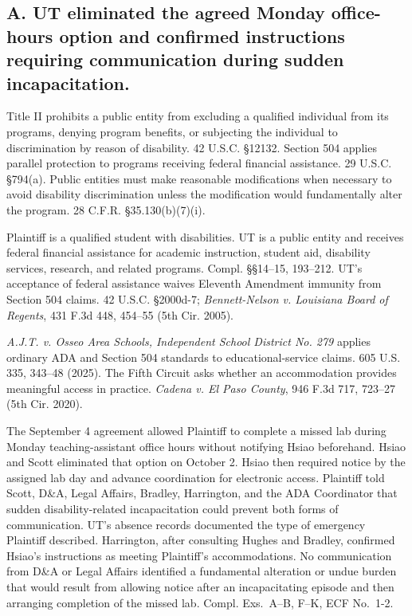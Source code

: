 \documentclass[12pt]{article}
\newcommand{\ComplExs}[1]{Compl. Exs.~#1, ECF No.~1-2}
\begin{document}
\subsection*{A. UT eliminated the agreed Monday office-hours option and confirmed instructions requiring communication during sudden incapacitation.}
 
Title II prohibits a public entity from excluding a qualified individual from its programs, denying program benefits, or subjecting the individual to discrimination by reason of disability. 42 U.S.C. \S 12132. Section 504 applies parallel protection to programs receiving federal financial assistance. 29 U.S.C. \S 794(a). Public entities must make reasonable modifications when necessary to avoid disability discrimination unless the modification would fundamentally alter the program. 28 C.F.R. \S 35.130(b)(7)(i).
 
Plaintiff is a qualified student with disabilities. UT is a public entity and receives federal financial assistance for academic instruction, student aid, disability services, research, and related programs. Compl. \S\S 14--15, 193--212. UT's acceptance of federal assistance waives Eleventh Amendment immunity from Section 504 claims. 42 U.S.C. \S 2000d-7; \textit{Bennett-Nelson v. Louisiana Board of Regents}, 431 F.3d 448, 454--55 (5th Cir. 2005).
 
\textit{A.J.T. v. Osseo Area Schools, Independent School District No. 279} applies ordinary ADA and Section 504 standards to educational-service claims. 605 U.S. 335, 343--48 (2025). The Fifth Circuit asks whether an accommodation provides meaningful access in practice. \textit{Cadena v. El Paso County}, 946 F.3d 717, 723--27 (5th Cir. 2020).
 
The September 4 agreement allowed Plaintiff to complete a missed lab during Monday teaching-assistant office hours without notifying Hsiao beforehand. Hsiao and Scott eliminated that option on October 2. Hsiao then required notice by the assigned lab day and advance coordination for electronic access. Plaintiff told Scott, D\&A, Legal Affairs, Bradley, Harrington, and the ADA Coordinator that sudden disability-related incapacitation could prevent both forms of communication. UT's absence records documented the type of emergency Plaintiff described. Harrington, after consulting Hughes and Bradley, confirmed Hsiao's instructions as meeting Plaintiff's accommodations. No communication from D\&A or Legal Affairs identified a fundamental alteration or undue burden that would result from allowing notice after an incapacitating episode and then arranging completion of the missed lab. \ComplExs{A--B, F--K}.
 
\end{document}
